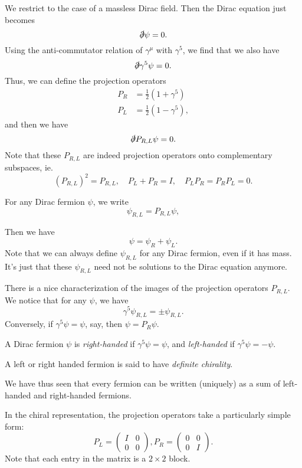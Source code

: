 \documentclass[a4paper]{article}
\begin{document}
We restrict to the case of a massless Dirac field. Then the Dirac equation just becomes
\[
  \slashed{\partial} \psi = 0.
\]
Using the anti-commutator relation of $\gamma^\mu$ with $\gamma^5$, we find that we also have
\[
  \slashed{\partial} \gamma^5 \psi = 0.
\]
Thus, we can define the projection operators
\begin{align*}
  P_R &= \frac{1}{2} (1 + \gamma^5)\\
  P_L &= \frac{1}{2} (1 - \gamma^5),
\end{align*}
and then we have
\[
  \slashed \partial P_{R, L} \psi = 0.
\]
Note that these $P_{R, L}$ are indeed projection operators onto complementary subspaces, ie.
\[
  (P_{R, L})^2 = P_{R, L},\quad P_L + P_R = I,\quad P_L P_R = P_R P_L = 0.
\]
\begin{notation}[$\psi_{R, L}$]
  For any Dirac fermion $\psi$, we write
  \[
    \psi_{R, L} = P_{R, L} \psi,
  \]
\end{notation}
Then we have
\[
  \psi = \psi_R + \psi_L.
\]
Note that we can always define $\psi_{R, L}$ for any Dirac fermion, even if it has mass. It's just that these $\psi_{R, L}$ need not be solutions to the Dirac equation anymore.

There is a nice characterization of the images of the projection operators $P_{R, L}$. We notice that for any $\psi$, we have
\[
  \gamma^5 \psi_{R, L} = \pm \psi_{R, L}.
\]
Conversely, if $\gamma^5 \psi = \psi$, say, then $\psi = P_R \psi$.

\begin{defi}[Chirality]
  A Dirac fermion $\psi$ is \emph{right-handed} if $\gamma^5 \psi = \psi$, and \emph{left-handed} if $\gamma^5 \psi =- \psi$.

  A left or right handed fermion is said to have \emph{definite chirality}.
\end{defi}
We have thus seen that every fermion can be written (uniquely) as a sum of left-handed and right-handed fermions.

In the chiral representation, the projection operators take a particularly simple form:
\[
  P_L =
  \begin{pmatrix}
    I & 0\\
    0 & 0
  \end{pmatrix},
  P_R =
  \begin{pmatrix}
    0 & 0\\
    0 & I
  \end{pmatrix}.
\]
Note that each entry in the matrix is a $2 \times 2$ block.
\end{document}

